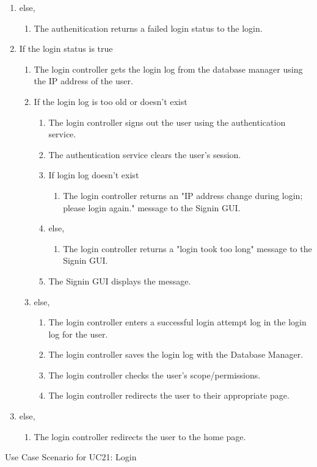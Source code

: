 \documentclass[11pt]{article}
\begin{document}
\begin{table}[H]
{{\begin{enumerate}[label=4.\arabic*.]
\begin{enumerate}[label*=\arabic*.]
				\item The authentication returns a true login in status to the login controller.
			\end{enumerate}
			\item else, 
			\begin{enumerate}[label*=\arabic*.]
				\item The authenitication returns a failed login status to the login.
			\end{enumerate}
			\item If the login status is true
			\begin{enumerate}[label*=\arabic*.]
				\item The login controller gets the login log from the database manager using the IP address of the user.
				\item If the login log is too old or doesn't exist
				\begin{enumerate}[label*=\arabic*.]
					\item The login controller signs out the user using the authentication service.
					\item The authentication service clears the user's session.
					\item If login log doesn't exist
					\begin{enumerate}[label*=\arabic*.]
						\item The login controller returns an "IP address change during login; please login again." message to the Signin GUI.
					\end{enumerate}
					\item else, 
					\begin{enumerate}[label*=\arabic*.]
						\item The login controller returns a "login took too long" message to the Signin GUI. 
					\end{enumerate}
					\item The Signin GUI displays the message.
				\end{enumerate}
				\item else,
				\begin{enumerate}[label*=\arabic*.]
					\item The login controller enters a successful login attempt log in the login log for the user.
					\item The login controller saves the login log with the Database Manager.
					\item The login controller checks the user's scope/permissions.
					\item The login controller redirects the user to their appropriate page. 
				\end{enumerate}
			\end{enumerate}
			\item else,
			\begin{enumerate}[label*=\arabic*.]
				\item The login controller redirects the user to the home page. 
			\end{enumerate}
		\end{enumerate}
	}}
	\caption{Use Case Scenario for UC21: Login}
\end{table}
\end{document}

